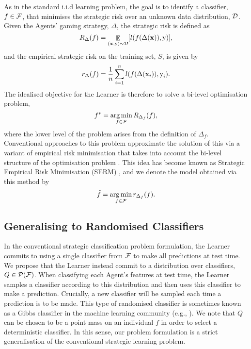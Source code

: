 As in the standard i.i.d learning problem, the goal is to identify a classifier, $f \in {\mathcal{F}}$, that minimises the strategic risk over an unknown data distribution, ${\mathcal{D}}$. Given the Agents' gaming strategy, $\Delta$, the strategic risk is defined as
\begin{equation}
    R_{\Delta}(f) = \mathop{\mathbb{E}}_{({\mathbf{x}},{\textnormal{y}}) \sim \mathcal{D}}[l(f(\Delta({\mathbf{x}})), {\textnormal{y}})],
    \label{eqn:strategic_risk}
\end{equation}
and the empirical strategic risk on the training set, $S$, is given by
\begin{equation}
    r_{\Delta}(f) = \frac{1}{n}\sum_{i=1}^{n}l(f(\Delta({\mathbf{x}}_{i})),{\textnormal{y}}_{i}).
    \label{eqn:empirical_strategic_risk}
\end{equation}
The idealised objective for the Learner is therefore to solve a bi-level optimisation problem,
\begin{equation}
    f^\ast = \operatorname*{arg\,min}_{f \in {\mathcal{F}}} R_{\Delta_f} (f),
\end{equation}
where the lower level of the problem arises from the definition of $\Delta_f$. Conventional approaches to this problem approximate the solution of this via a variant of empirical risk minimisation that takes into account the bi-level structure of the optimisation problem \citep{hardt2016, levanon2021, levanon2022}. This idea has become known as Strategic Empirical Risk Minimisation (SERM) \citep{levanon2021}, and we denote the model obtained via this method by
\begin{equation}
    \hat{f} = \operatorname*{arg\,min}_{f \in {\mathcal{F}}} r_{\Delta_f}(f).
\end{equation}

\subsection{Generalising to Randomised Classifiers}
\label{sec:mixed_strategies_and_cogameability}
In the conventional strategic classification problem formulation, the Learner commits to using a single classifier from ${\mathcal{F}}$ to make all predictions at test time. We propose that the Learner instead commit to a distribution over classifiers, $Q \in {\mathcal{P}}({\mathcal{F}})$. When classifying each Agent's features at test time, the Learner samples a classifier according to this distribution and then uses this classifier to make a prediction. Crucially, a new classifier will be sampled each time a prediction is to be made. This type of randomised classifier is sometimes known as a Gibbs classifier in the machine learning community (e.g., \citet{ng2001convergence}). We note that $Q$ can be chosen to be a point mass on an individual $f$ in order to select a deterministic classifier. In this sense, our problem formulation is a strict generalisation of the conventional strategic learning problem.

